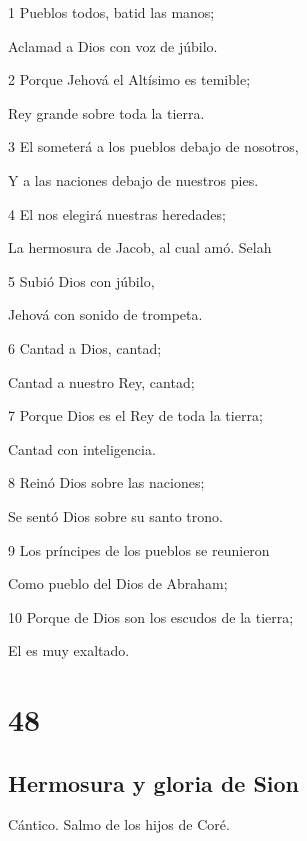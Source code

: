 \par 1 Pueblos todos, batid las manos;
\par Aclamad a Dios con voz de júbilo.
\par 2 Porque Jehová el Altísimo es temible;
\par Rey grande sobre toda la tierra.
\par 3 El someterá a los pueblos debajo de nosotros,
\par Y a las naciones debajo de nuestros pies.
\par 4 El nos elegirá nuestras heredades;
\par La hermosura de Jacob, al cual amó. Selah
\par 5 Subió Dios con júbilo,
\par Jehová con sonido de trompeta.
\par 6 Cantad a Dios, cantad;
\par Cantad a nuestro Rey, cantad;
\par 7 Porque Dios es el Rey de toda la tierra;
\par Cantad con inteligencia.
\par 8 Reinó Dios sobre las naciones;
\par Se sentó Dios sobre su santo trono.
\par 9 Los príncipes de los pueblos se reunieron
\par Como pueblo del Dios de Abraham;
\par 10 Porque de Dios son los escudos de la tierra;
\par El es muy exaltado.

\chapter{48}

\section*{Hermosura y gloria de Sion}

\par Cántico. Salmo de los hijos de Coré.

